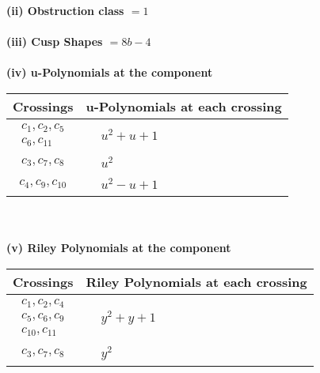 \documentclass[1p]{elsarticle_modified}
\theoremstyle{definition}
\begin{document}
\flushleft \textbf{(ii) Obstruction class $= 1$}\\~\\
\flushleft \textbf{(iii) Cusp Shapes $= 8 b-4$}\\~\\
\newpage\renewcommand{\arraystretch}{1}
\flushleft \textbf{(iv) u-Polynomials at the component}\newline \\
\begin{tabular}{m{50pt}|m{274pt}}
Crossings & \hspace{64pt}u-Polynomials at each crossing \\
\hline $$\begin{aligned}c_{1},c_{2},c_{5}\\c_{6},c_{11}\end{aligned}$$&$\begin{aligned}
&u^2+u+1
\end{aligned}$\\
\hline $$\begin{aligned}c_{3},c_{7},c_{8}\end{aligned}$$&$\begin{aligned}
&u^2
\end{aligned}$\\
\hline $$\begin{aligned}c_{4},c_{9},c_{10}\end{aligned}$$&$\begin{aligned}
&u^2- u+1
\end{aligned}$\\
\hline
\end{tabular}\\~\\
\newpage\renewcommand{\arraystretch}{1}
\flushleft \textbf{(v) Riley Polynomials at the component}\newline \\
\begin{tabular}{m{50pt}|m{274pt}}
Crossings & \hspace{64pt}Riley Polynomials at each crossing \\
\hline $$\begin{aligned}c_{1},c_{2},c_{4}\\c_{5},c_{6},c_{9}\\c_{10},c_{11}\end{aligned}$$&$\begin{aligned}
&y^2+y+1
\end{aligned}$\\
\hline $$\begin{aligned}c_{3},c_{7},c_{8}\end{aligned}$$&$\begin{aligned}
&y^2
\end{aligned}$\\
\hline
\end{tabular}\\~\\
\end{document}

